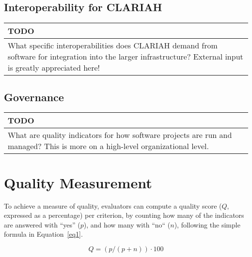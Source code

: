 \documentclass[a4paper,11pt]{article}
\newenvironment{TODO}{
\begin{center}
    \begin{tabular}[h!]{|p{0.8\textwidth}|}
    \hline
    {\bf TODO}\\\hline}
{   \\\hline
    \end{tabular}
\end{center}}
\begin{document}
\subsection{Interoperability for CLARIAH}\label{sec:intCLA}


\begin{TODO} 
What specific interoperabilities does CLARIAH demand from software for
integration into the larger infrastructure?  External input is greatly
appreciated here!
\end{TODO}


\subsection{Governance}\label{sec:gov}




\begin{TODO} 
What are quality indicators for how software projects are run and
managed? This is more on a high-level organizational level.
\end{TODO}


\section{Quality Measurement}

To achieve a measure of quality, evaluators can compute a quality score ($Q$,
expressed as a percentage) per criterion, by counting how many of the
indicators are answered with ``yes'' ($p$), and how many with ``no`` ($n$),
following the simple formula in Equation~\ref{eq1}.

\begin{equation}
\label{eq1}
Q = (p / (p + n)) \cdot 100
\end{equation}
\end{document}
